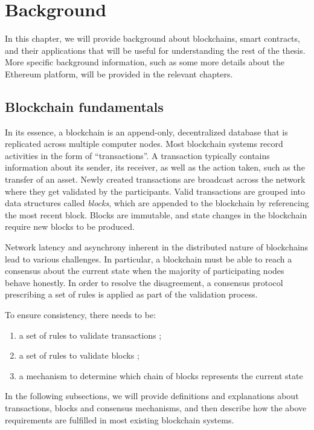 \chapter{Background}
\label{ch:background}

In this chapter, we will provide background about blockchains, smart contracts, and their applications that will be useful for understanding the rest of the thesis.
More specific background information, such as some more details about the Ethereum platform, will be provided in the relevant chapters.

\section{Blockchain fundamentals}
In its essence, a blockchain is an append-only, decentralized database that is replicated across multiple computer nodes.
Most blockchain systems record activities in the form of ``transactions''.
A transaction typically contains information about its sender, its receiver, as well as the action taken, such as the transfer of an asset.
Newly created transactions are broadcast across the network where they get validated by the participants.
Valid transactions are grouped into data structures called \textit{blocks}, which are appended to the blockchain by referencing the most recent block.
Blocks are immutable, and state changes in the blockchain require new blocks to be produced.

Network latency and asynchrony inherent in the distributed nature of blockchains lead to various challenges.
In particular, a blockchain must be able to reach a consensus about the current state when the majority of participating nodes behave honestly.
In order to resolve the disagreement, a consensus protocol prescribing a set of rules is applied as part of the validation process.

To ensure consistency, there needs to be:

\begin{enumerate}\itemsep=-1pt
    \item a set of rules to validate transactions \label{req1};
    \item a set of rules to validate blocks \label{req2};
    \item a mechanism to determine which chain of blocks represents the current state \label{req3}
\end{enumerate}

%
In the following subsections, we will provide definitions and explanations about transactions, blocks and consensus mechanisms, and then describe how the above requirements are fulfilled in most existing blockchain systems.

